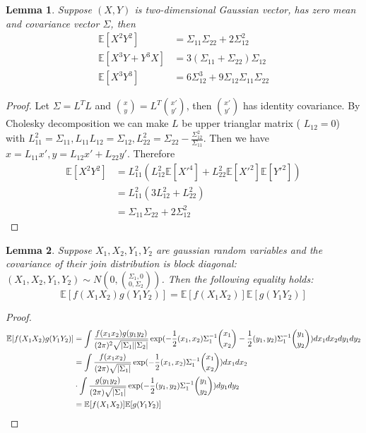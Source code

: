 \documentclass{article}
\DeclarePairedDelimiter\abs{\lvert}{\rvert}
\def\E{\mathbb{E}}
\newtheorem{lemma}{Lemma}
\begin{document}
\begin{lemma}\label{lem:x2y2}
Suppose $(X,Y)$ is two-dimensional Gaussian vector, has zero mean and covariance vector $\Sigma$, then 
\begin{align}
\E[X^2 Y^2] &= \Sigma_{11}\Sigma_{22} + 2\Sigma_{12}^2 \\
\E[X^3 Y + Y^3 X ] &= 3 (\Sigma_{11} + \Sigma_{22}) \Sigma_{12} \\
\E[X^3 Y^3] & = 6 \Sigma_{12}^3 + 9 \Sigma_{12} \Sigma_{11} \Sigma_{22}
\end{align}
\end{lemma}
\begin{proof}
Let $\Sigma = L^T L $ and $\binom{x}{y} = L^T \binom{x'}{y'}$, then $\binom{x'}{y'}$ has identity covariance. By Cholesky decomposition we can make $L$ be upper trianglar matrix (
$L_{12}=0$) with $L_{11}^2 = \Sigma_{11}, L_{11}L_{12} = \Sigma_{12}, L_{22}^2 = \Sigma_{22} - \frac{\Sigma_{12}^2}{\Sigma_{11}}$. Then we have $x = L_{11} x', y = L_{12} x' + L_{22} y'$. Therefore
\begin{align*}
\E[X^2 Y^2] & = L_{11}^2 (L_{12}^2\E[X'^4]+ L^2_{22}\E[X'^2]\E[Y'^2]) \\
& = L_{11}^2(3L_{12}^2 + L^2_{22}) \\
& = \Sigma_{11}\Sigma_{22} + 2\Sigma_{12}^2
\end{align*}
\end{proof}
\begin{lemma}\label{lem:abcd}
Suppose $X_1, X_2, Y_1, Y_2$ are gaussian random variables and the covariance of their join distribution is block diagonal:
$(X_1, X_2, Y_1, Y_2) \sim N(0, \binom{\Sigma_1, 0}{0, \Sigma_2})$. Then the following equality holds:
\begin{equation}
\E[f(X_1X_2)g(Y_1Y_2)] = \E[f(X_1 X_2)] \E[g(Y_1 Y_2)]
\end{equation}
\end{lemma}
\begin{proof}
\begin{align*}
\E[f(X_1X_2)g(Y_1Y_2)] & = \int \frac{f(x_1 x_2) g(y_1 y_2) }{(2\pi)^2 \sqrt{\abs{\Sigma_1}\abs{\Sigma_2}}}\exp(-\frac{1}{2}(x_1, x_2) \Sigma_1^{-1} \binom{x_1}{x_2}-\frac{1}{2}(y_1, y_2) \Sigma_1^{-1} \binom{y_1}{y_2})dx_1 d x_2 dy_1 dy_2 \\
& = \int \frac{f(x_1 x_2)  }{(2\pi) \sqrt{\abs{\Sigma_1}}}\exp(-\frac{1}{2}(x_1, x_2) \Sigma_1^{-1} \binom{x_1}{x_2})dx_1 d x_2  \\
&\cdot  \int \frac{ g(y_1 y_2)  }{(2\pi) \sqrt{\abs{\Sigma_1}}}\exp(-\frac{1}{2}(y_1, y_2) \Sigma_1^{-1} \binom{y_1}{y_2})dy_1 d y_2 \\
& = \E[f(X_1 X_2)] \E[g(Y_1 Y_2)]
\end{align*}
\end{proof}
\end{document}
